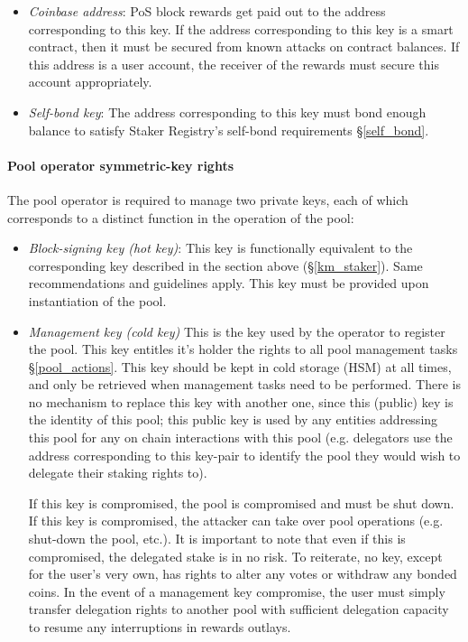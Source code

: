 \begin{itemize}
    \item \textit{Coinbase address}: PoS block rewards get paid out to the address corresponding to this key. If the address corresponding to this key is a smart contract, then it must be secured from known attacks on contract balances. If this address is a user account, the receiver of the rewards must secure this account appropriately.
    
    \item \textit{Self-bond key}: The address corresponding to this key must bond enough balance to satisfy Staker Registry's self-bond requirements \S\ref{self_bond}. 
\end{itemize}


\paragraph{Pool operator symmetric-key rights} The pool operator is required to manage two private keys, each of which corresponds to a distinct function in the operation of the pool: 
\begin{itemize}
   
    \item \textit{Block-signing key (hot key)}: This key is functionally equivalent to the corresponding key described in the section above (\S\ref{km_staker}). Same recommendations and guidelines apply. This key must be provided upon instantiation of the pool. 
    
    \item \textit{Management key (cold key)}  This is the key used by the operator to register the pool. This key entitles it's holder the rights to all pool management tasks \S\ref{pool_actions}. This key should be kept in cold storage (HSM) at all times, and only be retrieved when management tasks need to be performed. There is no mechanism to replace this key with another one, since this (public) key is the identity of this pool; this public key is used by any entities addressing this pool for any on chain interactions with this pool (e.g. delegators use the address corresponding to this key-pair to identify the pool they would wish to delegate their staking rights to). 
    
    If this key is compromised, the pool is compromised and must be shut down. If this key is compromised, the attacker can take over pool operations (e.g. shut-down the pool, etc.). It is important to note that even if this  is compromised, the delegated stake is in no risk. To reiterate, no key, except for the user's very own, has rights to alter any votes or withdraw any bonded coins. In the event of a management key compromise, the user must simply transfer delegation rights to another pool with sufficient delegation capacity to resume any interruptions in rewards outlays. 
\end{itemize}

